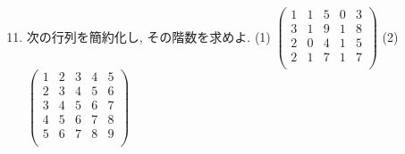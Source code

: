 \documentclass[dvipdfmx,a4paper,11pt]{article} %
\theoremstyle{definition}
\begin{document}
 
 \begin{enumerate}[label=\textbf{問題}\arabic*.]
 \setcounter{enumi}{10}
 \item 次の行列を簡約化し, その階数を求めよ.
(1)
$
 \begin{pmatrix}
 1& 1& 5  & 0&3\\
 3& 1& 9  & 1&8\\
 2& 0& 4 & 1&5\\
 2& 1& 7 & 1&7\\
 \end{pmatrix}
 $
   \quad 
(2)
$
 \begin{pmatrix}
 1& 2& 3  & 4&5\\
 2& 3& 4  & 5&6\\
 3& 4& 5 & 6&7\\
 4& 5& 6 & 7&8\\
 5& 6& 7 & 8&9\\
 \end{pmatrix}
 $
 \end{enumerate}
 \newpage
\end{document}
